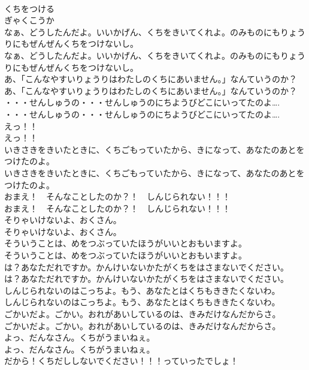 \documentclass[8pt]{extreport}
\begin{document}
\begin{CJK}{UTF8}{min}
\\	くちをつける
\\	ぎゃくこうか
\\	なぁ、どうしたんだよ。いいかげん、くちをきいてくれよ。のみものにもりょうりにもぜんぜんくちをつけないし。
\\	なぁ、どうしたんだよ。いいかげん、くちをきいてくれよ。のみものにもりょうりにもぜんぜんくちをつけないし。
\\	あ、「こんなやすいりょうりはわたしのくちにあいません。」なんていうのか？
\\	あ、「こんなやすいりょうりはわたしのくちにあいません。」なんていうのか？
\\	・・・せんしゅうの・・・せんしゅうのにちようびどこにいってたのよ….
\\	・・・せんしゅうの・・・せんしゅうのにちようびどこにいってたのよ….
\\	えっ！！
\\	えっ！！
\\	いきさきをきいたときに、くちごもっていたから、きになって、あなたのあとをつけたのよ。
\\	いきさきをきいたときに、くちごもっていたから、きになって、あなたのあとをつけたのよ。
\\	おまえ！　そんなことしたのか？！　しんじられない！！！
\\	おまえ！　そんなことしたのか？！　しんじられない！！！
\\	そりゃいけないよ、おくさん。
\\	そりゃいけないよ、おくさん。
\\	そういうことは、めをつぶっていたほうがいいとおもいますよ。
\\	そういうことは、めをつぶっていたほうがいいとおもいますよ。
\\	は？あなただれですか。かんけいないかたがくちをはさまないでください。
\\	は？あなただれですか。かんけいないかたがくちをはさまないでください。
\\	しんじられないのはこっちよ。もう、あなたとはくちもききたくないわ。
\\	しんじられないのはこっちよ。もう、あなたとはくちもききたくないわ。
\\	ごかいだよ。ごかい。おれがあいしているのは、きみだけなんだからさ。
\\	ごかいだよ。ごかい。おれがあいしているのは、きみだけなんだからさ。
\\	よっ、だんなさん。くちがうまいねぇ。
\\	よっ、だんなさん。くちがうまいねぇ。
\\	だから！くちだししないでください！！！っていったでしょ！

\end{CJK}
\end{document}
